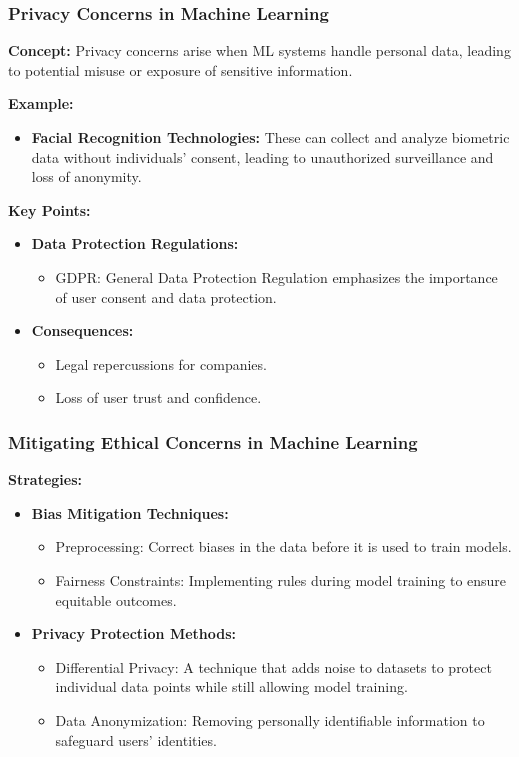 \documentclass[aspectratio=169]{beamer}
\begin{document}
\begin{frame}[fragile]
    \frametitle{Privacy Concerns in Machine Learning}
    \textbf{Concept:} Privacy concerns arise when ML systems handle personal data, leading to potential misuse or exposure of sensitive information.
    
    \textbf{Example:} 
    \begin{itemize}
        \item \textbf{Facial Recognition Technologies:} These can collect and analyze biometric data without individuals' consent, leading to unauthorized surveillance and loss of anonymity.
    \end{itemize}

    \textbf{Key Points:}
    \begin{itemize}
        \item \textbf{Data Protection Regulations:}
        \begin{itemize}
            \item GDPR: General Data Protection Regulation emphasizes the importance of user consent and data protection.
        \end{itemize}

        \item \textbf{Consequences:}
        \begin{itemize}
            \item Legal repercussions for companies.
            \item Loss of user trust and confidence.
        \end{itemize}
    \end{itemize}
\end{frame}

\begin{frame}[fragile]
    \frametitle{Mitigating Ethical Concerns in Machine Learning}
    \textbf{Strategies:}
    
    \begin{itemize}
        \item \textbf{Bias Mitigation Techniques:}
        \begin{itemize}
            \item Preprocessing: Correct biases in the data before it is used to train models.
            \item Fairness Constraints: Implementing rules during model training to ensure equitable outcomes.
        \end{itemize}
        
        \item \textbf{Privacy Protection Methods:}
        \begin{itemize}
            \item Differential Privacy: A technique that adds noise to datasets to protect individual data points while still allowing model training.
            \item Data Anonymization: Removing personally identifiable information to safeguard users' identities.
        \end{itemize}
    \end{itemize}
\end{frame}
\end{document}
